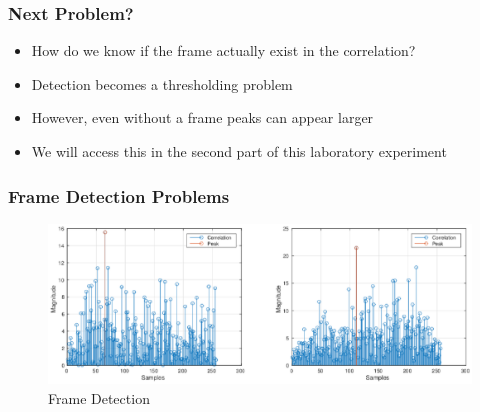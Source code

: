 \documentclass[10pt]{beamer}
\begin{document}
\frame
{
  \frametitle{Next Problem?}
    \begin{itemize}
    \item How do we know if the frame actually exist in the correlation?
    \item Detection becomes a thresholding problem 
    \item However, even without a frame peaks can appear larger
    \item We will access this in the second part of this laboratory experiment
    \end{itemize}

}

\frame
{
  \frametitle{Frame Detection Problems}
    \begin{figure}
  				\includegraphics[width=\linewidth, scale=0.5]{Problem.eps}
 				 \caption{Frame Detection}
  				\label{fig:Correlation with and without signal being present}
		\end{figure}

}
\end{document}

